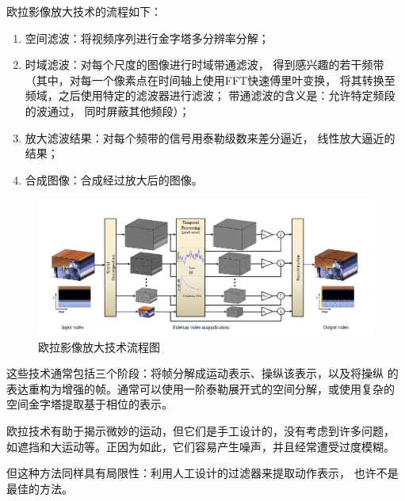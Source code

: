 \documentclass[AutoFakeBold]{MyFormat}
\begin{document}
\par 欧拉影像放大技术的流程如下：
\begin{enumerate}
    \item 空间滤波：将视频序列进行金字塔多分辨率分解；
    \item 时域滤波：对每个尺度的图像进行时域带通滤波，
    得到感兴趣的若干频带（其中，对每一个像素点在时间轴上使用FFT快速傅里叶变换，
    将其转换至频域，之后使用特定的滤波器进行滤波；
    带通滤波的含义是：允许特定频段的波通过，
    同时屏蔽其他频段）；
    \item 放大滤波结果：对每个频带的信号用泰勒级数来差分逼近，
    线性放大逼近的结果；
    \item 合成图像：合成经过放大后的图像。    
\end{enumerate}
\begin{figure}[!h]
    \centering
    \includegraphics[width=\linewidth]
    {figures/2022.06.08/Eulerian Video mag.png}
    \caption{欧拉影像放大技术流程图}
\end{figure}

\par 这些技术通常包括三个阶段：将帧分解成运动表示、操纵该表示，以及将操纵
的表达重构为增强的帧。通常可以使用一阶泰勒展开式的空间分解，或使用复杂的
空间金字塔提取基于相位的表示。
\par 欧拉技术有助于揭示微妙的运动，但它们是手工设计的，没有考虑到许多问题，
如遮挡和大运动等。正因为如此，它们容易产生噪声，并且经常遭受过度模糊。

\par 但这种方法同样具有局限性：利用人工设计的过滤器来提取动作表示，
也许不是最佳的方法。
\end{document}
